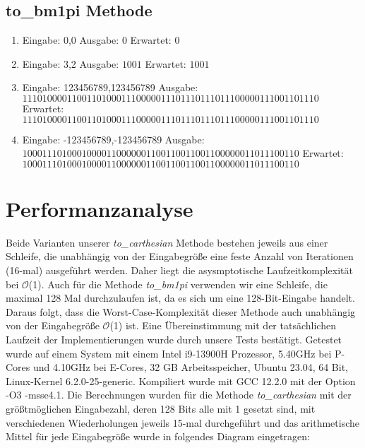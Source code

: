 \documentclass[course=erap]{aspdoc}
\begin{document}
    \subsection{to\_bm1pi Methode}
    \begin{enumerate}[label=\roman*)]
        \item Eingabe: 0,0 \quad  Ausgabe: $0$ \quad Erwartet: $0$
        \item Eingabe: 3,2 \quad Ausgabe: $1001$ \quad Erwartet: $1001$
        \item Eingabe: 123456789,123456789 \newline Ausgabe: $111010000110011010001110000011101110111011100000111001101110$
        \newline Erwartet: $111010000110011010001110000011101110111011100000111001101110$

        \item Eingabe: -123456789,-123456789 \newline Ausgabe: $10001110100010000110000001100110011001100000011011100110$
        \newline Erwartet:
        $10001110100010000110000001100110011001100000011011100110$
    \end{enumerate}


    \section{Performanzanalyse}
    Beide Varianten unserer \textit{to\_carthesian} Methode bestehen jeweils aus einer Schleife, die unabhängig von der Eingabegröße eine feste Anzahl von Iterationen (16-mal) ausgeführt werden.
    Daher liegt die asysmptotische Laufzeitkomplexität bei \( \mathcal{O} \)(1).
    Auch für die Methode \textit{to\_bm1pi }verwenden wir eine Schleife, die maximal 128 Mal durchzulaufen ist, da es sich um eine 128-Bit-Eingabe handelt.
    Daraus folgt, dass die Worst-Case-Komplexität dieser Methode auch unabhängig von der Eingabegröße \( \mathcal{O} \)(1) ist.
    Eine Übereinstimmung mit der tatsächlichen Laufzeit der Implementierungen wurde durch unsere Tests bestätigt.
    \vspace{10pt} \newline
    Getestet wurde auf einem System mit einem Intel i9-13900H Prozessor, 5.40GHz bei P-Cores und 4.10GHz bei E-Cores, 32 GB Arbeitsspeicher, Ubuntu 23.04, 64 Bit, Linux-Kernel 6.2.0-25-generic.
    Kompiliert wurde mit GCC 12.2.0 mit der Option -O3 -msse4.1.
    Die Berechnungen wurden für die Methode \textit{to\_carthesian} mit der größtmöglichen Eingabezahl, deren 128 Bits alle mit 1 gesetzt sind, mit verschiedenen Wiederholungen jeweils 15-mal durchgeführt und das arithmetische Mittel für jede Eingabegröße wurde in folgendes Diagram eingetragen:
    \vspace{10pt}
\end{document}

